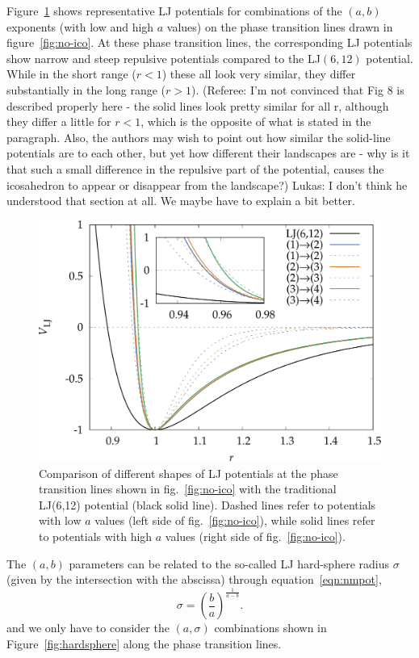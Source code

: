 Figure~\ref{fig:compareLJ} shows representative LJ potentials for combinations
of the $(a,b)$ exponents (with low and high $a$ values) on the phase transition
lines drawn in figure~\ref{fig:no-ico}. At these phase transition lines, the
corresponding LJ potentials show narrow and steep repulsive potentials compared
to the LJ$(6,12)$ potential.  While in the short range ($r<1$) these all look
very similar, they differ substantially in the long range ($r>1$).
{\color{red} (Referee: I'm not convinced that Fig 8 is described properly here - the solid lines look pretty similar for all r, although they differ a little for $r<1$, which is the opposite of what is stated in the paragraph. Also, the authors may wish to point out how similar the solid-line potentials are to each other, but yet how different their landscapes are - why is it that such a small difference in the repulsive part of the potential, causes the icosahedron to appear or disappear from the landscape?)
}
{\color{blue}Lukas: I don't think he understood that section at all. We maybe have to explain a bit better.}
\begin{figure}[htb]\centering
    \includegraphics[width=.8\columnwidth]{gregory-newton/compareLJ.pdf}
    \caption{Comparison of different shapes of LJ potentials at the phase
    transition lines shown in fig.~\ref{fig:no-ico} with the traditional
    LJ(6,12) potential (black solid line). Dashed lines refer to potentials
    with low $a$ values (left side of fig.~\ref{fig:no-ico}), while solid lines
    refer to potentials with high $a$ values (right side of
    fig.~\ref{fig:no-ico}).}
    \label{fig:compareLJ}
\end{figure}

The $(a,b)$ parameters can be related to the so-called LJ hard-sphere radius $\sigma$ (given by the
intersection with the abscissa) through equation~\eqref{eqn:nmpot}, 
\begin{equation}
    \sigma=\left(\frac{b}{a}\right)^{\frac{1}{a-b}}.
\end{equation}
and we only have to consider the $(a,\sigma)$ combinations shown in  
Figure~\ref{fig:hardsphere} along the phase transition lines.

